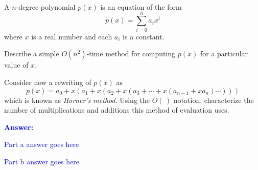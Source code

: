 \item{}
A $n$-degree polynomial $p(x)$ is an equation of the form
$$p(x)=\sum_{i=0}^na_ix^i$$
where $x$ is a real number and each $a_i$ is a constant.
\begin{list}{\textbf{}}{}
\item Describe a simple $O(n^2)$-time method for computing $p(x)$ for a
particular value of $x$.
\item Consider now a rewriting of $p(x)$ as
$$p(x)=a_0+x\left(a_1+x\left(a_2+x\left(a_3+\cdots+x\left(a_{n-1}+xa_n\right)
\cdots\right)\right)\right)$$
which is known as \emph{Horner's method}. Using the $O(\,)$ notation,
characterize the number of multiplications and additions this method of
evaluation uses.\\[12pt]
\end{list}
\vskip12pt
\ifanswers
\textcolor{blue}{
\textbf{Answer:}\\
\begin{list}{\textbf{}}{}
\item Part a answer goes here
\item Part b answer goes here
\end{list}
}
\newpage
\fi
